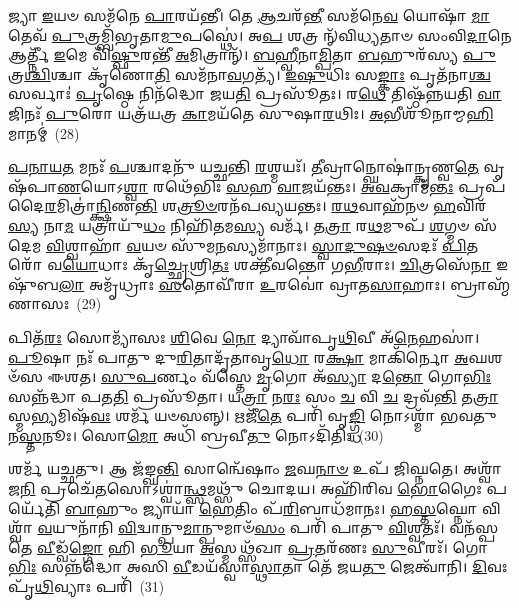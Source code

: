 𑌜𑍍𑌯𑌾 \ul{𑌇}\-𑌯𑍞 𑌸𑌮᳴𑌨𑍇 \ul{𑌪𑌾}\-𑌰𑌯᳴𑌨𑍍𑌤𑍀। 𑌤𑍇 \ul{𑌆}\-𑌚𑌰᳴\-\ul{𑌨𑍍𑌤𑍀} 𑌸𑌮᳴𑌨𑍇\-\ul{𑌵} 𑌯𑍋𑌷𑌾᳴ \ul{𑌮𑌾}\-𑌤𑍇𑌵᳴ \ul{𑌪𑍁}\-𑌤𑍍𑌰𑌮𑍍𑌬𑌿᳴𑌭𑍃𑌤𑌾\-\ul{𑌮𑍁}\-𑌪𑌸𑍍𑌥𑍇॑। 𑌅\-\ul{𑌪} 𑌶𑌤𑍍𑌰 𑌨𑍍᳴𑌵𑌿𑌧𑍍𑌯𑌤𑌾𑍞 𑌸𑌂𑌵𑌿\-\ul{𑌦𑌾}\-𑌨𑍇 𑌆𑌰𑍍𑌤𑍍𑌨𑍀᳴ \ul{𑌇}\-𑌮𑍇 𑌵𑌿᳴\-\ul{𑌷𑍍𑌫𑍁}\-𑌰𑌨𑍍𑌤𑍀᳴ \ul{𑌅}\-𑌮𑌿𑌤𑍍𑌰𑌾𑌨𑍍᳴। \ul{𑌬}\-\-\ul{𑌹𑍍𑌵𑍀}\-𑌨𑌾\-\ul{𑌮𑍍𑌪𑌿}\-𑌤𑌾 \ul{𑌬}\-𑌹𑍁𑌰᳴𑌸𑍍𑌯 \ul{𑌪𑍁}\-𑌤𑍍𑌰\-\ul{𑌶𑍍𑌚𑌿}\-𑌶𑍍𑌚𑌾 𑌕𑍃᳴𑌣𑍋\-\ul{𑌤𑌿} 𑌸𑌮᳴𑌨𑌾\-\ul{𑌵}\-𑌗𑌤𑍍𑌯᳴। \ul{𑌇}\-\-\ul{𑌷𑍁}\-𑌧𑌿𑌃 𑌸\-\ul{𑌙𑍍𑌕𑌾𑌃} 𑌪𑍃𑌤᳴𑌨𑌾\-\ul{𑌶𑍍𑌚} 𑌸𑌰𑍍𑌵𑌾𑌃॑ \ul{𑌪𑍃}\-𑌷𑍍𑌠𑍇 𑌨𑌿𑌨᳴𑌦𑍍𑌧𑍋 𑌜𑌯\-\ul{𑌤𑌿} 𑌪𑍍𑌰𑌸𑍂᳴𑌤𑌃। 𑌰\-\ul{𑌥𑍇} 𑌤𑌿𑌷𑍍𑌠᳴𑌨𑍍𑌨𑌯𑌤𑌿 \ul{𑌵𑌾}\-𑌜𑌿𑌨𑌃᳴ \ul{𑌪𑍁}\-𑌰𑍋 𑌯𑌤𑍍𑌰᳴𑌯𑌤𑍍𑌰 \ul{𑌕𑌾}\-𑌮𑌯᳴𑌤𑍇 𑌸𑍁𑌷𑌾\-\ul{𑌰}\-𑌥𑌿𑌃। \ul{𑌅}\-𑌭𑍀𑌶𑍂᳴𑌨𑌾𑌮𑍍𑌮\-\ul{𑌹𑌿}\-𑌮𑌾𑌨𑌮𑍍॑~(28)

\-\ul{𑌪}\-\-\ul{𑌨𑌾}\-\-\ul{𑌯}\-\-\ul{𑌤} 𑌮𑌨𑌃᳴ \ul{𑌪}\-𑌶𑍍𑌚𑌾𑌦𑌨𑍁᳴ 𑌯𑌚𑍍𑌛𑌨𑍍𑌤𑌿 \ul{𑌰}\-𑌶𑍍𑌮𑌯𑌃᳴। \ul{𑌤𑍀}\-𑌵𑍍𑌰𑌾𑌨𑍍𑌘𑍋𑌷𑌾॑𑌨𑍍𑌕𑍃𑌣𑍍𑌵\-\ul{𑌤𑍇} 𑌵𑍃𑌷᳴𑌪𑌾\-\ul{𑌣}\-𑌯𑍋\-𑌽\-\ul{𑌶𑍍𑌵𑌾} 𑌰𑌥𑍇᳴𑌭𑌿𑌃 \ul{𑌸}\-𑌹 \ul{𑌵𑌾}\-𑌜𑌯᳴𑌨𑍍𑌤𑌃। \ul{𑌅}\-\-\ul{𑌵}\-𑌕𑍍𑌰𑌾𑌮᳴\-\ul{𑌨𑍍𑌤𑌃} 𑌪𑍍𑌰𑌪᳴𑌦𑍈\-\ul{𑌰}\-𑌮𑌿𑌤𑍍𑌰𑌾॑\-\ul{𑌨𑍍𑌕𑍍𑌷𑌿}\-𑌣\-\ul{𑌨𑍍𑌤𑌿} 𑌶\-\ul{𑌤𑍍𑌰𑍂}\-\-\ul{𑍞}\-𑌰𑌨᳴𑌪𑌵𑍍𑌯𑌯𑌨𑍍𑌤𑌃। \ul{𑌰}\-\-\ul{𑌥}\-𑌵𑌾𑌹᳴𑌨𑍞 \ul{𑌹}\-𑌵𑌿𑌰᳴\-\ul{𑌸𑍍𑌯} 𑌨𑌾\-\ul{𑌮} 𑌯𑌤𑍍𑌰𑌾𑌯𑍁᳴\-\ul{𑌧𑌂} 𑌨𑌿𑌹𑌿᳴𑌤𑌮\-\ul{𑌸𑍍𑌯} 𑌵𑌰𑍍𑌮᳴। 𑌤\-\ul{𑌤𑍍𑌰𑌾} 𑌰\-\ul{𑌥}\-𑌮𑍁𑌪᳴ \ul{𑌶}\-𑌗𑍍𑌮𑍞 𑌸᳴𑌦𑍇𑌮 \ul{𑌵𑌿}\-𑌶𑍍𑌵𑌾𑌹𑌾᳴ \ul{𑌵}\-𑌯𑍞 𑌸𑍁᳴𑌮\-\ul{𑌨}\-𑌸𑍍𑌯𑌮𑌾᳴𑌨𑌾𑌃। \ul{𑌸𑍍𑌵𑌾}\-\-\ul{𑌦𑍁}\-\-\ul{𑌷}\-\-\ul{𑍞}\-𑌸𑌦𑌃᳴ \ul{𑌪𑌿}\-𑌤𑌰𑍋᳴ 𑌵\-\ul{𑌯𑍋}\-𑌧𑌾𑌃 𑌕𑍃᳴\-\ul{𑌚𑍍𑌛𑍍𑌰𑍇}\-𑌶𑍍𑌰𑌿\-\ul{𑌤𑌃} 𑌶𑌕𑍍𑌤𑍀᳴𑌵𑌨𑍍𑌤𑍋 𑌗\-\ul{𑌭𑍀}\-𑌰𑌾𑌃। \ul{𑌚𑌿}\-𑌤𑍍𑌰𑌸𑍇᳴\-\ul{𑌨𑌾} 𑌇𑌷𑍁᳴𑌬\-\ul{𑌲𑌾} 𑌅𑌮𑍃᳴𑌧𑍍𑌰𑌾𑌃 \ul{𑌸}\-𑌤𑍋𑌵𑍀᳴𑌰𑌾 \ul{𑌉}\-𑌰𑌵𑍋॑ 𑌵𑍍𑌰𑌾𑌤\-\ul{𑌸𑌾}\-𑌹𑌾𑌃। 𑌬𑍍𑌰𑌾𑌹𑍍𑌮᳴𑌣𑌾𑌸𑌃~(29)

𑌪𑌿𑌤᳴\-\ul{𑌰𑌃} 𑌸𑍋𑌮𑍍𑌯𑌾᳴𑌸𑌃 \ul{𑌶𑌿}\-𑌵𑍇 \ul{𑌨𑍋} 𑌦𑍍𑌯𑌾𑌵𑌾᳴𑌪𑍃\-\ul{𑌥𑌿}\-𑌵𑍀 𑌅᳴\-\ul{𑌨𑍇}\-𑌹𑌸𑌾॑। \ul{𑌪𑍂}\-𑌷𑌾 𑌨𑌃᳴ 𑌪𑌾𑌤𑍁 𑌦𑍁\-\ul{𑌰𑌿}\-𑌤𑌾𑌦𑍃᳴𑌤𑌾𑌵𑍃\-\ul{𑌧𑍋} 𑌰\-\ul{𑌕𑍍𑌷𑌾} 𑌮𑌾𑌕𑌿᳴𑌰𑍍𑌨𑍋 \ul{𑌅}\-𑌘𑌶𑍞᳴𑌸 𑌈𑌶𑌤। \ul{𑌸𑍁}\-\-\ul{𑌪}\-𑌰𑍍𑌣𑌂 𑌵᳴𑌸𑍍𑌤𑍇 \ul{𑌮𑍃}\-𑌗𑍋 𑌅᳴\-\ul{𑌸𑍍𑌯𑌾} 𑌦\-\ul{𑌨𑍍𑌤𑍋} 𑌗𑍋\-\ul{𑌭𑌿𑌃} 𑌸𑌨𑍍𑌨᳴𑌦𑍍𑌧𑌾 𑌪𑌤\-\ul{𑌤𑌿} 𑌪𑍍𑌰𑌸𑍂᳴𑌤𑌾। 𑌯\-\ul{𑌤𑍍𑌰𑌾} 𑌨\-\ul{𑌰𑌃} 𑌸𑌂 \ul{𑌚} 𑌵𑌿 \ul{𑌚} 𑌦𑍍𑌰𑌵᳴\-\ul{𑌨𑍍𑌤𑌿} 𑌤\-\ul{𑌤𑍍𑌰𑌾}\-𑌸𑍍𑌮\-\ul{𑌭𑍍𑌯}\-𑌮𑌿𑌷᳴\-\ul{𑌵𑌃} 𑌶𑌰𑍍𑌮᳴ 𑌯𑍞𑌸𑌨𑍍𑌨𑍍। 𑌋𑌜𑍀᳴\-\ul{𑌤𑍇} 𑌪𑌰𑌿᳴ 𑌵𑍃\-\ul{𑌙𑍍𑌗𑍍𑌧𑌿} 𑌨𑍋\-𑌽𑌶𑍍𑌮𑌾᳴ 𑌭𑌵𑌤𑍁 𑌨\-\ul{𑌸𑍍𑌤}\-𑌨𑍂𑌃। 𑌸𑍋\-\ul{𑌮𑍋} 𑌅𑌧𑌿᳴ 𑌬𑍍𑌰𑌵𑍀\-\ul{𑌤𑍁} 𑌨𑍋\-𑌽𑌦𑌿᳴𑌤𑌿𑌃~(30)

𑌶𑌰𑍍𑌮᳴ 𑌯𑌚𑍍𑌛𑌤𑍁। 𑌆 𑌜᳴𑌙𑍍𑌘\-\ul{𑌨𑍍𑌤𑌿} 𑌸𑌾𑌨𑍍𑌵𑍇᳴𑌷𑌾𑌂 \ul{𑌜}\-𑌘\-\ul{𑌨𑌾}\-\-\ul{𑍞} 𑌉𑌪᳴ 𑌜𑌿𑌘𑍍𑌨𑌤𑍇। 𑌅𑌶𑍍𑌵𑌾᳴𑌜\-\ul{𑌨𑌿} 𑌪𑍍𑌰𑌚𑍇᳴\-\ul{𑌤}\-𑌸𑍋\-𑌽𑌶𑍍𑌵𑌾॑\-\ul{𑌨𑍍𑌥𑍍𑌸}\-𑌮𑌥𑍍𑌸𑍁᳴ 𑌚𑍋𑌦𑌯। 𑌅𑌹𑌿᳴𑌰𑌿𑌵 \ul{𑌭𑍋}\-𑌗𑍈𑌃 𑌪𑌰𑍍𑌯𑍇᳴𑌤𑌿 \ul{𑌬𑌾}\-𑌹𑍁𑌂 𑌜𑍍𑌯𑌾𑌯𑌾᳴ \ul{𑌹𑍇}\-𑌤𑌿𑌂 𑌪᳴\-\ul{𑌰𑌿}\-𑌬𑌾𑌧᳴𑌮𑌾𑌨𑌃। \ul{𑌹}\-\-\ul{𑌸𑍍𑌤}\-𑌘𑍍𑌨𑍋 𑌵𑌿𑌶𑍍𑌵𑌾᳴ \ul{𑌵}\-𑌯𑍁𑌨𑌾᳴𑌨𑌿 \ul{𑌵𑌿}\-𑌦𑍍𑌵𑌾𑌨𑍍𑌪𑍁\-\ul{𑌮𑌾}\-𑌨𑍍𑌪𑍁𑌮𑌾𑍞᳴\-\ul{𑌸𑌂} 𑌪𑌰𑌿᳴ 𑌪𑌾𑌤𑍁 \ul{𑌵𑌿}\-𑌶𑍍𑌵𑌤𑌃᳴। 𑌵𑌨᳴𑌸𑍍𑌪𑌤𑍇 \ul{𑌵𑍀}\-𑌡𑍍𑌵᳴\-\ul{𑌙𑍍𑌗𑍋} 𑌹𑌿 \ul{𑌭𑍂}\-𑌯𑌾 \ul{𑌅}\-𑌸𑍍𑌮𑌥𑍍𑌸᳴𑌖𑌾 \ul{𑌪𑍍𑌰}\-𑌤𑌰᳴𑌣𑌃 \ul{𑌸𑍁}\-𑌵𑍀𑌰𑌃᳴। 𑌗𑍋\-\ul{𑌭𑌿𑌃} 𑌸𑌨𑍍𑌨᳴𑌦𑍍𑌧𑍋 𑌅𑌸𑌿 \ul{𑌵𑍀}\-𑌡𑌯᳴𑌸𑍍𑌵𑌾\-\ul{𑌸𑍍𑌥𑌾}\-𑌤𑌾 𑌤𑍇᳴ 𑌜𑌯\-\ul{𑌤𑍁} 𑌜𑍇𑌤𑍍𑌵𑌾᳴𑌨𑌿। \ul{𑌦𑌿}\-𑌵𑌃 𑌪𑍃᳴\-\ul{𑌥𑌿}\-𑌵𑍍𑌯𑌾𑌃 𑌪𑌰𑌿᳴~(31)

